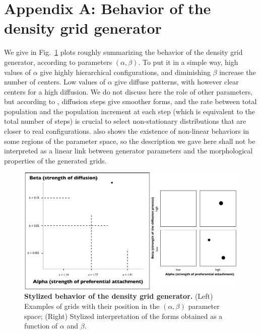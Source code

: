 \documentclass{JASSS}
\begin{document}


\section{Appendix A: Behavior of the density grid generator}

We give in Fig.~\ref{fig:stylized-generator} plots roughly summarizing the behavior of the density grid generator, according to parameters $(\alpha,\beta)$. To put it in a simple way, high values of $\alpha$ give highly hierarchical configurations, and diminishing $\beta$ increase the number of centers. Low values of $\alpha$ give diffuse patterns, with however clear centers for a high diffusion. We do not discuss here the role of other parameters, but according to \cite{raimbault2018calibration}, diffusion steps give smoother forms, and the rate between total population and the population increment at each step (which is equivalent to the total number of steps) is crucial to select non-stationary distributions that are closer to real configurations. \cite{raimbault2018calibration} also shows the existence of non-linear behaviors in some regions of the parameter space, so the description we gave here shall not be interpreted as a linear link between generator parameters and the morphological properties of the generated grids.


\begin{figure}[!t]
	\centering
    \includegraphics[width=\textwidth]{figures/Fig7.png}
    \caption{\textbf{Stylized behavior of the density grid generator.} (Left) Examples of grids with their position in the $(\alpha,\beta)$ parameter space; (Right) Stylized interpretation of the forms obtained as a function of $\alpha$ and $\beta$.}\label{fig:stylized-generator}
\end{figure}
\end{document}
